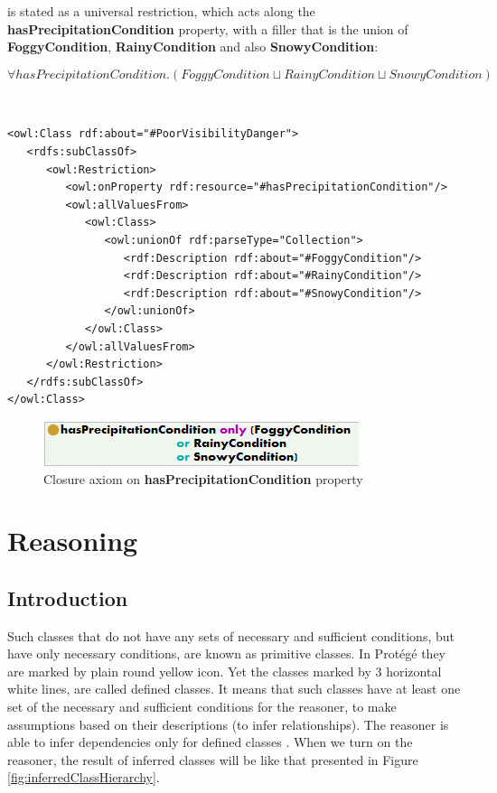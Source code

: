 \noindent is stated as a universal restriction, which acts along the \textbf{hasPrecipitationCondition} property, with a filler that is the union of \textbf{FoggyCondition}, \textbf{RainyCondition} and also \textbf{SnowyCondition}:

\[
\forall hasPrecipitationCondition. (FoggyCondition \sqcup RainyCondition \sqcup SnowyCondition)
\]

\smallskip

{\tt \small
\begin{verbatim}
<owl:Class rdf:about="#PoorVisibilityDanger">
   <rdfs:subClassOf>
      <owl:Restriction>
         <owl:onProperty rdf:resource="#hasPrecipitationCondition"/>
         <owl:allValuesFrom>
            <owl:Class>
               <owl:unionOf rdf:parseType="Collection">
                  <rdf:Description rdf:about="#FoggyCondition"/>
                  <rdf:Description rdf:about="#RainyCondition"/>
                  <rdf:Description rdf:about="#SnowyCondition"/>
               </owl:unionOf>
            </owl:Class>
         </owl:allValuesFrom>
      </owl:Restriction>
   </rdfs:subClassOf>
</owl:Class>
\end{verbatim}
}

\medskip

\begin{figure}[htp]
\centering
\includegraphics[scale=0.7]{images/chapter3/ClosureAxiomPart2}
\caption{Closure axiom on \textbf{hasPrecipitationCondition} property}
\label{fig:closureAxiom}
\end{figure}

\newpage

\section{Reasoning}
\label{sec:reasoning}

\subsection{Introduction}
\label{sub:introduction}

Such classes that do not have any sets of necessary and sufficient conditions, but have only necessary conditions, are known as primitive classes. In Protégé they are marked by plain round yellow icon. Yet the classes marked by 3 horizontal white lines, are called defined classes. It means that such classes have at least one set of the necessary and sufficient conditions for the reasoner, to make assumptions based on their descriptions (to infer relationships). The reasoner is able to infer dependencies only for defined classes \cite{OWLGuide}. When we turn on the reasoner, the result of inferred classes will be like that presented in Figure \ref{fig:inferredClassHierarchy}.

